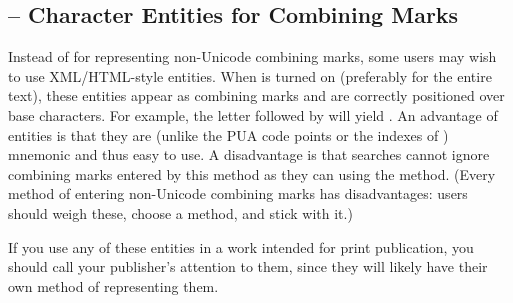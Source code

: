\subsection{ -- Character Entities for Combining Marks}\hypertarget{ss10}{}
Instead of  for representing non-Unicode combining marks, some users may
wish to use XML/HTML-style entities. When  is turned on (preferably for the entire
text), these entities appear as combining marks and are correctly positioned over base characters.
For example, the letter  followed by
 will yield . An advantage of entities is that
they are (unlike the PUA code points or the indexes of ) mnemonic and thus easy to use.
A disadvantage is that
searches cannot ignore combining marks entered by this method as they can using the  method.
(Every method of entering non-Unicode combining marks has disadvantages: users should weigh these, choose a method,
and stick with it.)

If you use any of these entities in a work intended for print publication, you should call your publisher’s
attention to them, since they will likely have their own method of representing them.

